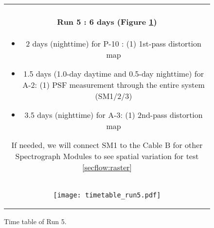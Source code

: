 \begin{figure}[!ht]
\begin{center}
\begin{tabular}{c}
\begin{minipage}{0.95\hsize}
\paragraph{Run 5 : 6 days  (Figure \ref{fig:run5})}
	\begin{itemize}
	\item 2 days (nighttime) for P-10 : 
	(1) 1st-pass distortion map
	\item 1.5 days (1.0-day daytime and 0.5-day nighttime) for A-2: 
	(1) PSF measurement through the entire system (SM1/2/3)
	\item 3.5 days (nighttime) for A-3: 
	(1) 2nd-pass distortion map
	\end{itemize}
If needed, we will connect SM1 to the Cable B for other Spectrograph Modules to see spatial variation for test \ref{secflow:raster}
\end{minipage} \\
\begin{minipage}{0.8\hsize}
	\begin{center}
	\vspace*{5mm}
	\texttt{[image: timetable\_run5.pdf]}
	\end{center}
	\vspace*{-5mm}
	\caption{Time table of Run 5.}
	\label{fig:run5}
\end{minipage}
\end{tabular}
\end{center}
\end{figure}


